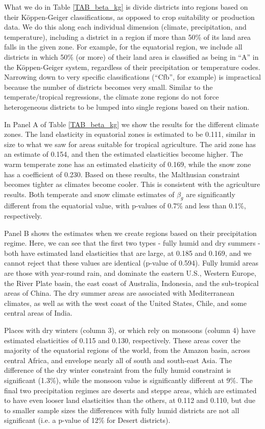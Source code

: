 \documentclass[11pt]{article}
\begin{document}
What we do in Table \ref{TAB_beta_kg} is divide districts into regions based on their K{\"o}ppen-Geiger classifications, as opposed to crop suitability or production data. We do this along each individual dimension (climate, precipitation, and temperature), including a district in a region if more than 50\% of its land area falls in the given zone. For example, for the equatorial region, we include all districts in which 50\% (or more) of their land area is classified as being in ``A'' in the K{\"o}ppen-Geiger system, regardless of their precipitation or temperature codes. Narrowing down to very specific classifications (``Cfb'', for example) is impractical because the number of districts becomes very small. Similar to the temperate/tropical regressions, the climate zone regions do not force heterogeneous districts to be lumped into single regions based on their nation. 

In Panel A of Table \ref{TAB_beta_kg} we show the results for the different climate zones. The land elasticity in equatorial zones is estimated to be 0.111, similar in size to what we saw for areas suitable for tropical agriculture. The arid zone has an estimate of 0.154, and then the estimated elasticities become higher. The warm temperate zone has an estimated elasticity of 0.169, while the snow zone has a coefficient of 0.230. Based on these results, the Malthusian constraint becomes tighter as climates become cooler. This is consistent with the agriculture results. Both temperate and snow climate estimates of $\beta_g$ are significantly different from the equatorial value, with p-values of 0.7\% and less than 0.1\%, respectively.

Panel B shows the estimates when we create regions based on their precipitation regime. Here, we can see that the first two types - fully humid and dry summers - both have estimated land elasticities that are large, at 0.185 and 0.169, and we cannot reject that these values are identical (p-value of 0.594). Fully humid areas are those with year-round rain, and dominate the eastern U.S., Western Europe, the River Plate basin, the east coast of Australia, Indonesia, and the sub-tropical areas of China. The dry summer areas are associated with Mediterranean climates, as well as with the west coast of the United States, Chile, and some central areas of India.

Places with dry winters (column 3), or which rely on monsoons (column 4) have estimated elasticities of 0.115 and 0.130, respectively. These areas cover the majority of the equatorial regions of the world, from the Amazon basin, across central Africa, and envelope nearly all of south and south-east Asia. The difference of the dry winter constraint from the fully humid constraint is significant (1.3\%), while the monsoon value is significantly different at 9\%. The final two precipitation regimes are deserts and steppe areas, which are estimated to have even looser land elasticities than the others, at 0.112 and 0.110, but due to smaller sample sizes the differences with fully humid districts are not all significant (i.e. a p-value of 12\% for Desert districts).
\end{document}
